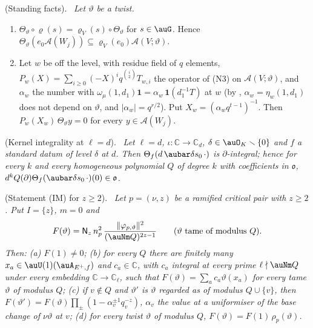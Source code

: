 \documentclass[10pt]{amsart}
\theoremstyle{definition}
\theoremstyle{remark}
\newcommand{\C}{\mathbb C}
\providecommand{\pao}{\mathfrak o}
\providecommand{\plone}{\mathbf 1}
\providecommand{\poA}{\mathcal A}
\newenvironment{quotedthm}[2]{\par\medskip\noindent\begingroup
  \textbf{#1}#2.\ \itshape\ignorespaces}{\endgroup\par\medskip}
\begin{document}
\begin{quotedthm}{\cite[Lemma~2.2]{P54}}{ (Standing facts)}
Let $\vartheta$ be a twist.
\begin{enumerate}
\item[(L2)] $\Theta_\vartheta\circ\varrho(s)=\varrho_V(s)\circ\Theta_\vartheta$ for $s\in\auG$.
Hence $\Theta_\vartheta(e_0\poA(W_j))\subseteq\varrho_V(e_0)\poA(V;\vartheta)$.
\item[(L3)] Let $w$ be off the level, with residue field of $q$ elements, $P_w(X)=\sum_{i\ge0}
(-X)^iq^{\binom i2}T_{w,i}$ the operator of (N3) on $\poA(V;\vartheta)$, and $\alpha_w$ the number
with $\omega_\mu(1,d_1)\plone=\alpha_w\,\plone(d_1^{-1}T)$ at $w$ (by {\cite[(1)]{P54}}, $\alpha_w=\eta_w(1,d_1)$ does not depend on $\vartheta$, and
$|\alpha_w|=q^{r/2}$). Put $X_w=(\alpha_wq^{t-1})^{-1}$. Then $P_w(X_w)\,\Theta_\vartheta y=0$ for
every $y\in\poA(W_j)$.
\end{enumerate}
\end{quotedthm}

\begin{quotedthm}{\cite[Lemma~3.6]{P54}}{ (Kernel integrality at $\ell=d$)}
Let $\ell=d$, $\iota\colon\C\to\C_d$, $\delta\in\auO_K\smallsetminus\{0\}$ and $f$ a standard datum of
level $\delta$ at $d$. Then $\Theta_f(d\,\aubar\delta s_0\,\cdot)$ is $\partial$-integral; hence for every
$k$ and every homogeneous polynomial $Q$ of degree $k$ with coefficients in $\pao$, $d^kQ(\partial)
\Theta_f(\aubar\delta s_0\,\cdot)(0)\in\pao$.
\end{quotedthm}

\begin{quotedthm}{\cite[Proposition~3.8]{P54}}{ (Statement (IM) for $z\ge2$)}
Let $p=(\nu,z)$ be a ramified critical pair with $z\ge2$. Put $I=\{z\}$, $m=0$ and
\[
F(\vartheta)=\mathsf N_z\,n_p^2\,\frac{\|\varphi_{p,\vartheta}\|^2}{(\auNm Q)^{2z-1}}\qquad
(\vartheta\text{ tame of modulus }Q).
\]
Then: (a) $F(1)\ne0$; (b) for every $Q$ there are finitely many $x_a\in\auU(1)(\auA_{E^+,f})$ and
$c_a\in\C$, with $c_a$ integral at every prime $\ell\nmid\auNm Q$ under every embedding $\C\to\C_\ell$,
such that $F(\vartheta)=\sum_ac_a\vartheta(x_a)$ for every tame $\vartheta$ of modulus $Q$; (c) if $v\notin Q$ and $\vartheta'$ is
$\vartheta$ regarded as of modulus $Q\cup\{v\}$, then $F(\vartheta')=F(\vartheta)\prod_\pm(1-\alpha_v^{\pm1}
q_v^{-z})$, $\alpha_v$ the value at a uniformiser of the base change of $\nu\vartheta$ at $v$; (d) for
every twist $\vartheta$ of modulus $Q$, $F(\vartheta)=F(1)\,\rho_p(\vartheta)$.
\end{quotedthm}
\end{document}

